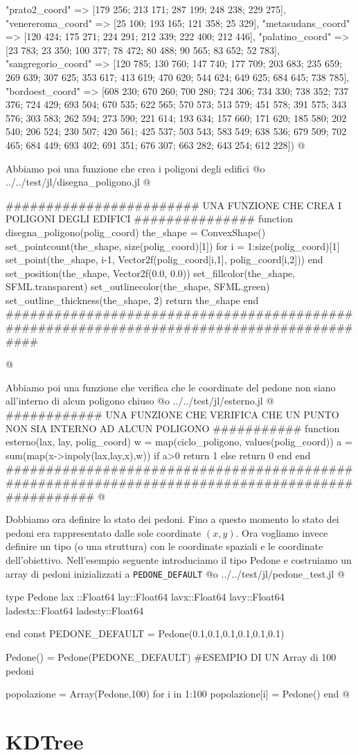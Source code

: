 \documentclass[]{article}
\begin{document}
{"prato2_coord" => [179 256; 213 171; 287 199; 248 238; 229 275],
"venereroma_coord" => [25 100; 193 165; 121 358; 25 329],
"metasudans_coord" => [120 424; 175 271; 224 291; 212 339; 222 400; 212 446],
"palatino_coord" => [23 783; 23 350; 100 377; 78 472; 80 488; 90 565; 83 652; 52 783],
"sangregorio_coord" => [120 785; 130 760; 147 740; 177 709; 203 683; 235 659; 269 639; 307 625; 353 617; 413 619; 470 620; 544 624; 649 625; 684 645; 738 785],
"bordoest_coord" => [608 230; 670 260; 700 280; 724 306; 734 330; 738 352; 737 376; 724 429; 693 504; 670 535; 622 565; 
570 573; 513 579; 451 578; 391 575; 343 576; 303 583; 262 594; 273 590; 221 614; 193 634; 157 660; 171 620; 185 580; 202 540; 206 524; 230 507; 420 561; 425 537;
503 543; 583 549; 638 536; 679 509; 702 465; 684 449; 693 402; 691 351; 676 307; 663 282; 643 254; 612 228])
@}

Abbiamo poi una funzione che crea i poligoni degli edifici
@o ../../test/jl/disegna_poligono.jl @{
######################## UNA FUNZIONE CHE CREA I POLIGONI DEGLI EDIFICI ###############
function disegna_poligono(polig_coord)
	the_shape = ConvexShape()
	set_pointcount(the_shape, size(polig_coord)[1])
	for i = 1:size(polig_coord)[1]
		set_point(the_shape, i-1, Vector2f(polig_coord[i,1], polig_coord[i,2]))
	end
	set_position(the_shape, Vector2f(0.0, 0.0))
	set_fillcolor(the_shape, SFML.transparent)
	set_outlinecolor(the_shape, SFML.green)
	set_outline_thickness(the_shape, 2)
	return the_shape
end
##########################################################################################

@}

Abbiamo poi una funzione che verifica che le coordinate del pedone non siano all'interno di alcun poligono chiuso
@o ../../test/jl/esterno.jl @{
############ UNA FUNZIONE CHE VERIFICA CHE UN PUNTO NON SIA INTERNO AD ALCUN POLIGONO ###########
function esterno(lax, lay, polig_coord)
w = map(ciclo_poligono, values(polig_coord))
a = sum(map(x->inpoly(lax,lay,x),w))
	if a>0
		return 1
	else
		return 0
	end
end
#################################################################################################
@}

Dobbiamo ora definire lo stato dei pedoni.
Fino a questo momento lo stato dei pedoni era rappresentato dalle sole coordinate $(x,y)$.
Ora vogliamo invece definire un tipo (o una struttura) con le coordinate spaziali e le coordinate dell'obiettivo.
Nell'esempio seguente introduciamo il tipo Pedone e costruiamo un array di pedoni inizializzati a {\tt PEDONE\_DEFAULT}
@o ../../test/jl/pedone_test.jl @{
type Pedone
		lax ::Float64
		lay::Float64
		lavx::Float64
		lavy::Float64
		ladestx::Float64
		ladesty::Float64
		
end
const PEDONE_DEFAULT = Pedone(0.1,0.1,0.1,0.1,0.1,0.1)

Pedone() = Pedone(PEDONE_DEFAULT)
\#ESEMPIO DI UN Array di 100 pedoni

popolazione = Array(Pedone,100)
for i in 1:100
	popolazione[i] = Pedone()
end
@}

\section{KDTree}

 

%
\end{document}
